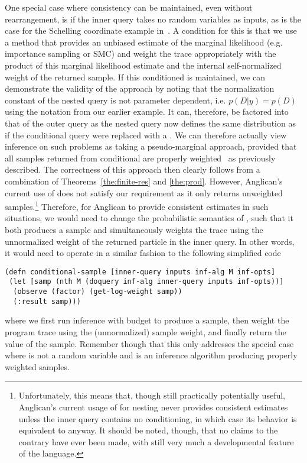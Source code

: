 One special case where consistency can be maintained, even without rearrangement,
 is if the inner query takes no 
random variables as inputs, as is the case for
the Schelling coordinate example in~\cite[Figure 6]{stuhlmuller2014reasoning}.  
A condition for this is that we use a method that provides an unbiased estimate of 
the marginal likelihood (e.g. importance sampling or SMC) and weight the trace appropriately
with the product of this marginal likelihood estimate and the internal self-normalized weight
of the returned sample.  
If this conditioned is maintained, we can demonstrate the validity of the approach by noting that
the normalization constant of the nested query is not parameter dependent, i.e. $p(D|y)=p(D)$ 
using the notation from our earlier example.  It can, therefore, 
be factored into that of the outer query as the nested query now defines the same distribution 
as if the conditional query were replaced with a .  We can therefore actually view inference 
on such problems as taking a pseudo-marginal approach, provided that all samples returned from
conditional are properly weighted~\citep{naessethLS2015nested} as previously described.
The correctness of this approach then clearly follows from a combination of
Theorems~\ref{the:finite-res} and \ref{the:prod}.
However, Anglican's current use of \conditional does not
satisfy our requirement as it only returns unweighted samples.\footnote{Unfortunately, this
	means that, though still practically potentially useful, Anglican's current usage of {\footnotesize {}}
	for nesting never provides consistent estimates unless the inner query contains no conditioning, 
	in which
	case its behavior is equivalent to  anyway.  It should be noted, though, that no claims 
	to the contrary have ever been made, with  still very much a developmental feature
	of the language.}
Therefore, for Anglican to provide consistent estimates in such situations, we would need to
change the probabilistic semantics of \conditional, such that it
both produces a sample and simultaneously weights the trace using the unnormalized weight of the returned particle in the inner query.  In other words, it would need to operate in a similar fashion
to the following simplified code
\begin{lstlisting}[basicstyle=\ttfamily\footnotesize,frame=none]
(defn conditional-sample [inner-query inputs inf-alg M inf-opts]
 (let [samp (nth M (doquery inf-alg inner-query inputs inf-opts))]
  (observe (factor) (get-log-weight samp))
  (:result samp)))
\end{lstlisting}
\vspace{-10pt}
where we first run inference with budget  to produce a sample, then weight the program trace
using the (unnormalized) sample weight, and finally return the value of the sample.
Remember though that this only addresses the special case where  is not a random variable
and  is an inference algorithm producing properly weighted samples.

